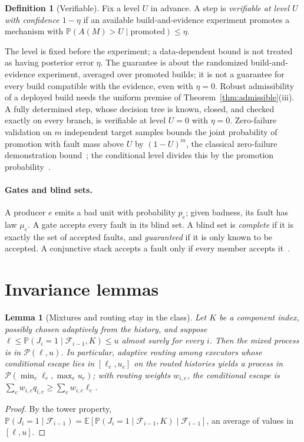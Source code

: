 \documentclass[11pt]{article}
\newtheorem{lemma}[theorem]{Lemma}
\theoremstyle{definition}
\newtheorem{definition}[theorem]{Definition}
\theoremstyle{remark}
\newcommand{\Prb}{\mathbb P}
\newcommand{\E}{\mathbb E}
\begin{document}
\begin{definition}[Verifiable]\label{def:verifiable}
Fix a level $U$ in advance. A step is \emph{verifiable at level $U$ with confidence $1-\eta$} if an
available build-and-evidence experiment promotes a mechanism with $\Prb(A(M)>U\mid
\text{promoted})\le\eta$.
\end{definition}
The level is fixed before the experiment; a data-dependent bound is not treated as having posterior
error $\eta$. The guarantee is about the randomized build-and-evidence experiment, averaged over
promoted builds; it is not a guarantee for every build compatible with the evidence, even with
$\eta=0$. Robust admissibility of a deployed build needs the uniform premise of
Theorem~\ref{thm:admissible}(iii). A fully determined step, whose decision tree is known, closed, and checked exactly on
every branch, is verifiable at level $U=0$ with $\eta=0$. Zero-failure validation on $m$ independent
target samples bounds the joint probability of promotion with fault mass above $U$ by $(1-U)^m$, the
classical zero-failure demonstration bound~\cite{littlewood93,butler93}; the conditional level divides
this by the promotion probability~\cite{p5}.

\paragraph{Gates and blind sets.}
A producer $e$ emits a bad unit with probability $p_e$; given badness, its fault has law $\mu_e$. A
gate accepts every fault in its blind set. A blind set is \emph{complete} if it is exactly the set of
accepted faults, and \emph{guaranteed} if it is only known to be accepted. A conjunctive stack
accepts a fault only if every member accepts it~\cite{p2}.

\section{Invariance lemmas}\label{sec:invariance}
\begin{lemma}[Mixtures and routing stay in the class]\label{lem:mixture}
Let $K$ be a component index, possibly chosen adaptively from the history, and suppose
$\ell\le\Prb(J_i=1\mid\mathcal F_{i-1},K)\le u$ almost surely for every $i$. Then the mixed process is
in $\mathcal P(\ell,u)$. In particular, adaptive routing among executors whose conditional escape
lies in $[\ell_e,u_e]$ on the routed histories yields a process in
$\mathcal P(\min_e\ell_e,\max_eu_e)$; with routing weights $w_{i,e}$, the conditional escape is
$\sum_ew_{i,e}q_{i,e}\ge\sum_ew_{i,e}\ell_e$.
\end{lemma}
\begin{proof}
By the tower property, $\Prb(J_i=1\mid\mathcal F_{i-1})=\E[\Prb(J_i=1\mid\mathcal F_{i-1},K)\mid
\mathcal F_{i-1}]$, an average of values in $[\ell,u]$.
\end{proof}
\end{document}
